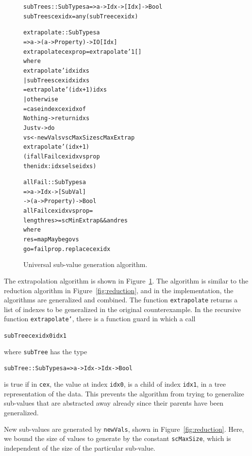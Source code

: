 \documentclass[10pt]{sigplanconf}
\newenvironment{code}{\begin{alltt}}{\end{alltt}}
\newcommand{\ttp}[1]{\texttt{#1}}
\begin{document}
\begin{figure}
  \begin{code}
subTrees :: SubTypes a => a -> Idx -> [Idx] -> Bool
subTrees cex idx = any (subTree cex idx)

extrapolate :: SubTypes a
            => a -> (a -> Property) -> IO [Idx]
extrapolate cex prop = extrapolate' 1 []
  where
  extrapolate' idx idxs
    | subTrees cex idx idxs
    = extrapolate' (idx+1) idxs
    | otherwise
    = case index cex idx of
        Nothing -> return idxs
        Just v  -> do
          vs <- newVals v scMaxSize scMaxExtrap
          extrapolate' (idx+1)
            (if allFail cex idx vs prop
               then idx:idxs else idxs)

allFail :: SubTypes a
        => a -> Idx -> [SubVal]
        -> (a -> Property) -> Bool
allFail cex idx vs prop =
  length res >= scMinExtrap && and res
  where
  res  = mapMaybe go vs
  go   = fail prop . replace cex idx
  \end{code}
  \caption{Universal sub-value generation algorithm.}
  \label{fig:universal}
\end{figure}

The extrapolation algorithm is shown in Figure~\ref{fig:universal}.  The
algorithm is similar to the reduction algorithm in Figure~\ref{fig:reduction},
and in the implementation, the algorithms are generalized and combined.  The
function \ttp{extrapolate} returns a list of indexes to be generalized in the
original counterexample.  In the recursive function \ttp{extrapolate'}, there is
a function guard in which a call
%
\begin{code}
subTree cex idx0 idx1
\end{code}
%
\noindent
where \ttp{subTree} has the type
%
\begin{code}
subTree :: SubTypes a => a -> Idx -> Idx -> Bool
\end{code}
%
\noindent
is true if in \ttp{cex}, the value at index \ttp{idx0}, is a child of index
\ttp{idx1}, in a tree representation of the data.  This prevents the algorithm
from trying to generalize sub-values that are abstracted away already since
their parents have been generalized.

New sub-values are generated by \ttp{newVals}, shown in
Figure~\ref{fig:reduction}.  Here, we bound the size of values to generate by
the constant \ttp{scMaxSize}, which is independent of the size of the particular
sub-value.
\end{document}
